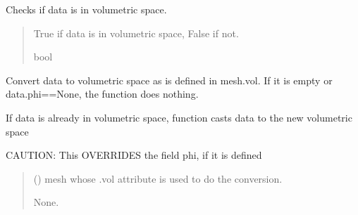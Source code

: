 \documentclass[letterpaper,10pt,english]{sphinxmanual}
\begin{document}
\begin{fulllineitems}
\begin{fulllineitems}
\label{\detokenize{_autosummary/nirfasterff.base.data.TPSFdata:nirfasterff.base.data.TPSFdata.isvol}}
\pysigstartsignatures
{}
\pysigstopsignatures
\sphinxAtStartPar
Checks if data is in volumetric space.
\begin{quote}\begin{description}
\sphinxAtStartPar
True if data is in volumetric space, False if not.

\sphinxAtStartPar
bool

\end{description}\end{quote}

\end{fulllineitems}


\begin{fulllineitems}
\label{\detokenize{_autosummary/nirfasterff.base.data.TPSFdata:nirfasterff.base.data.TPSFdata.togrid}}
\pysigstartsignatures
{}
\pysigstopsignatures
\sphinxAtStartPar
Convert data to volumetric space as is defined in mesh.vol. If it is empty or data.phi==None, the function does nothing.

\sphinxAtStartPar
If data is already in volumetric space, function casts data to the new volumetric space

\sphinxAtStartPar
CAUTION: This OVERRIDES the field phi, if it is defined
\begin{quote}\begin{description}
\sphinxAtStartPar
{} () \textendash{} mesh whose .vol attribute is used to do the conversion.

\sphinxAtStartPar
None.

\end{description}\end{quote}

\end{fulllineitems}



\end{fulllineitems}
\end{document}
